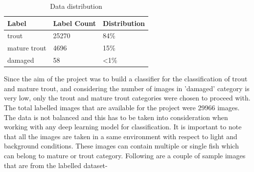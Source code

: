 \begin{table}[ht!]
\centering
    \begin{tabular}{ m{3cm} m{5cm} m{3cm} } 
    \toprule
    \toprule
    \textbf{Label} & \textbf{Label Count} & \textbf{Distribution} \\
    \midrule
    trout    & 25270    & 84\%                      \\[1.3ex]
    mature trout    & 4696    &  15\%                      \\[1.3ex]
    damaged    & 58    & <1\%                       \\[1.3ex]
    \bottomrule
    \end{tabular}
\caption[Data distribution]{Data distribution}
\label{table:data_distribution}
\end{table}

Since the aim of the project was to build a classifier for the classification of trout and mature trout, and considering the number of images in 'damaged' category is very low, only the trout and mature trout categories were chosen to proceed with. The total labelled images that are available for the project were 29966 images. The data is not balanced and this has to be taken into consideration when working with any deep learning model for classification. It is important to note that all the images are taken in a same environment with respect to light and background conditions. These images can contain multiple or single fish which can belong to mature or trout category. Following are a couple of sample images that are from the labelled dataset-
